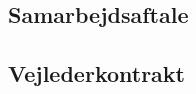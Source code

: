 \subsection{Samarbejdsaftale}
\label{sec:samarbejdsaftale}


\subsection{Vejlederkontrakt}
\label{sec:vejlederkontrakt}



%
%
%
%

